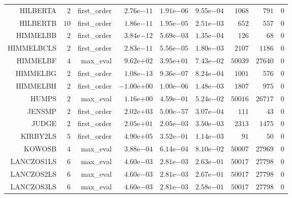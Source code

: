 \begin{longtable}{rrrrrrrrr}
HILBERTA & \(     2\) & first\_order & \( 2.76\)e\(-11\) & \( 1.91\)e\(-06\) & \( 9.55\)e\(-04\) & \(  1068\) & \(   791\) & \(     0\) \\
HILBERTB & \(    10\) & first\_order & \( 1.86\)e\(-11\) & \( 1.95\)e\(-05\) & \( 2.51\)e\(-03\) & \(   652\) & \(   557\) & \(     0\) \\
HIMMELBB & \(     2\) & first\_order & \( 3.84\)e\(-12\) & \( 5.69\)e\(-03\) & \( 1.35\)e\(-04\) & \(   126\) & \(    68\) & \(     0\) \\
HIMMELBCLS & \(     2\) & first\_order & \( 2.83\)e\(-11\) & \( 5.56\)e\(-05\) & \( 1.80\)e\(-03\) & \(  2107\) & \(  1186\) & \(     0\) \\
HIMMELBF & \(     4\) & max\_eval & \( 9.62\)e\(+02\) & \( 3.95\)e\(+01\) & \( 7.43\)e\(-02\) & \( 50039\) & \( 27640\) & \(     0\) \\
HIMMELBG & \(     2\) & first\_order & \( 1.08\)e\(-13\) & \( 9.36\)e\(-07\) & \( 8.24\)e\(-04\) & \(  1001\) & \(   576\) & \(     0\) \\
HIMMELBH & \(     2\) & first\_order & \(-1.00\)e\(+00\) & \( 1.00\)e\(-06\) & \( 1.48\)e\(-03\) & \(  1807\) & \(   975\) & \(     0\) \\
HUMPS & \(     2\) & max\_eval & \( 1.16\)e\(+00\) & \( 4.59\)e\(-01\) & \( 5.24\)e\(-02\) & \( 50016\) & \( 26717\) & \(     0\) \\
JENSMP & \(     2\) & first\_order & \( 2.02\)e\(+03\) & \( 5.00\)e\(-57\) & \( 3.07\)e\(-04\) & \(   111\) & \(    43\) & \(     0\) \\
JUDGE & \(     2\) & first\_order & \( 2.05\)e\(+01\) & \( 2.05\)e\(-03\) & \( 3.50\)e\(-03\) & \(  2313\) & \(  1475\) & \(     0\) \\
KIRBY2LS & \(     5\) & first\_order & \( 4.90\)e\(+05\) & \( 3.52\)e\(-01\) & \( 1.14\)e\(-03\) & \(    91\) & \(    50\) & \(     0\) \\
KOWOSB & \(     4\) & max\_eval & \( 3.88\)e\(-04\) & \( 6.14\)e\(-04\) & \( 8.10\)e\(-02\) & \( 50007\) & \( 27969\) & \(     0\) \\
LANCZOS1LS & \(     6\) & max\_eval & \( 4.60\)e\(-03\) & \( 2.81\)e\(-03\) & \( 2.63\)e\(-01\) & \( 50017\) & \( 27798\) & \(     0\) \\
LANCZOS2LS & \(     6\) & max\_eval & \( 4.60\)e\(-03\) & \( 2.81\)e\(-03\) & \( 2.67\)e\(-01\) & \( 50017\) & \( 27798\) & \(     0\) \\
LANCZOS3LS & \(     6\) & max\_eval & \( 4.60\)e\(-03\) & \( 2.81\)e\(-03\) & \( 2.58\)e\(-01\) & \( 50017\) & \( 27798\) & \(     0\) \\

\end{longtable}
